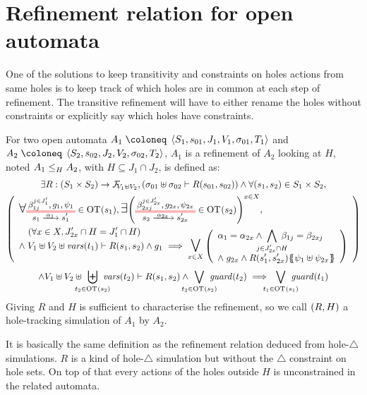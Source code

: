 \documentclass{article}
\begin{document}
\section{Refinement relation for open automata}\label{sec:refinement}
One of the solutions to keep transitivity and constraints on holes actions from same holes is to keep track of which holes are in common at each step of refinement.
The transitive refinement will have to either rename the holes without constraints or explicitly say which holes have constraints.
\begin{defi}
For two open automata \(A_1 \defobject \OA{S_1}{s_{01}}{J_1}{V_1}{\sigma_{01}}{T_1}\) and \(A_2 \defobject \OA{S_2}{s_{02}}{J_2}{V_2}{\sigma_{02}}{T_2}\), \(A_1\) is a refinement of \(A_2\) looking at \(H\), noted \(\wrel{A_1}{A_2}{H}\), with \(H \subseteq J_1 \cap J_2\), is defined as:
\begin{multline*}
	\exists R: \mpar{S_1 \times S_2} \to \rformulas[V_1 \uplus V_2], \mpar{\sigma_{01} \uplus \sigma_{02} \vdash R\mpar{s_{01}, s_{02}}} \wedge \forall \mpar{s_1, s_2} \in S_1 \times S_2, \\
	\mpar{\everymath{\displaystyle}\begin{array}{l}
		\bigsymb{\forall} \OTx{1}{}{1}{1} \in \fOT{s_1}, \bigsymb{\exists} \mpar{\OTx{2}{x}{2x}{2x} \in \fOT{s_2}}^{x \in X}, \\[12pt]
		\quad \mpar{\forall x \in X, J'_{2x} \cap H = J'_1 \cap H} \\[-10pt]
		\nwedge V_1 \uplus V_2 \uplus \fvars{t_1} \vdash R\mpar{s_1, s_2} \wedge g_1 \implies \operatorname*{\bigsymb{\bigvee}}_{x \in X} \mpar{\begin{array}{l}
			\alpha_1 = \alpha_{2x} \wedge \bigwedge_\subbox{j \in J'_{2x} \cap H} \beta_{1j} = \beta_{2xj} \\
			\nwedge g_{2x} \wedge R\mpar{s'_1, s'_{2x}}\psubst{\psi_1 \uplus \psi_{2x}}
		\end{array}} \\
	\end{array}} \\
	\wedge V_1 \uplus V_2 \uplus \biguplus_\subbox{t_2 \in \fOT{s_2}} \fvars{t_2} \vdash R\mpar{s_1, s_2} \wedge \bigvee_\subbox{t_2 \in \fOT{s_2}} \fguard{t_2} \implies \bigvee_\subbox{t_1 \in \fOT{s_1}} \fguard{t_1}
\end{multline*}
Giving \(R\) and \(H\) is sufficient to characterise the refinement, so we call \(\mpar{R, H}\) a hole-tracking simulation of \(A_1\) by \(A_2\).
\end{defi}
It is basically the same definition as the refinement relation deduced from hole-\(\triangle\) simulations.
\(R\) is a kind of hole-\(\triangle\) simulation but without the \(\triangle\) constraint on hole sets.
On top of that every actions of the holes outside \(H\) is unconstrained in the related automata.
\end{document}
